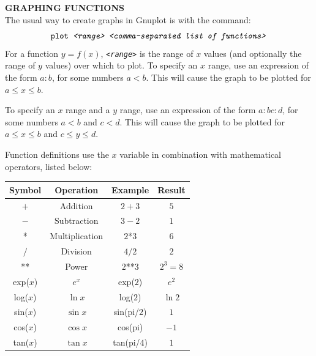 \par\noindent\textbf{\textsf{GRAPHING FUNCTIONS}}\vspace{2mm}\\
The usual way to create graphs in Gnuplot is with the \textbf{} command:
\begin{displaymath}
 \texttt{plot \emph{<range> <comma-separated list of functions>}}
\end{displaymath}
For a function $y=f(x)$, \texttt{\emph{<range>}} is the range of $x$ values (and optionally the
range of $y$ values) over which to plot. To specify an $x$ range, use an expression of the form
$a:b$, for some numbers $a<b$. This will cause the graph to
be plotted for $a\le x\le b$.\vspace{2mm}

To specify an $x$ range and a $y$ range, use an expression of the form
$a:b$$c:d$, for some numbers $a<b$ and $c<d$. This will
cause the graph to be plotted for $a\le x\le b$ and $c\le y \le d$.\vspace{2mm}

\par\noindent Function definitions use the $x$ variable in combination with mathematical operators,
listed below:\vspace{1mm}

\begin{center}
\begin{tabular}{@{} | c | c | c | c | @{}}
 \hline \textbf{Symbol} & \textbf{Operation} & \textbf{Example} & \textbf{Result}\\
 \hline $+$ & Addition & $2 + 3$ & $5$\\
 \hline $-$ & Subtraction & $3 - 2$ & $1$\\
 \hline * & Multiplication & $2$*$3$ & $6$\\
 \hline $/$ & Division & $4/2$ & $2$\\
 \hline ** & Power & $2$**$3$ & $2^3 = 8$\\
 \hline exp($x$) & $e^x$ & exp($2$) & $e^2$\\
 \hline log($x$) & $\ln x$ & log($2$) & $\ln 2$\\
 \hline sin($x$) & $\sin x$ & sin(pi/$2$) & $1$\\
 \hline cos($x$) & $\cos x$ & cos(pi) & $-1$\\
 \hline tan($x$) & $\tan x$ & tan(pi/$4$) & $1$\\\hline
\end{tabular}\end{center}

